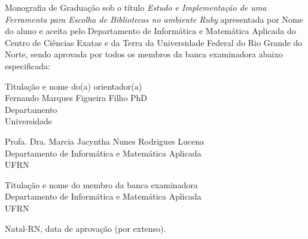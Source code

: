 \begin{folhadeaprovacao}
	\setlength{\ABNTsignthickness}{0.4pt}
	\setlength{\ABNTsignwidth}{10cm}
	
	\noindent 
	Monografia de Graduação sob o título \textit{Estudo e Implementação de uma Ferramenta para Escolha de Bibliotecas no ambiente Ruby} apresentada por 
	Nome do aluno e aceita pelo Departamento de Informática e Matemática Aplicada do
	Centro de Ciências Exatas e da Terra da Universidade Federal do Rio Grande do Norte,
	sendo aprovada por todos os membros da banca examinadora abaixo especificada:
		
	\assinatura
	{
		Titulação e nome do(a) orientador(a)\\
		{\small Fernando Marques Figueira Filho PhD} 															\\ 
		{\footnotesize
			Departamento 																	\\
		  	Universidade
		}
	}
		
	\assinatura
	{
		Profa. Dra. Marcia Jacyntha Nunes Rodrigues Lucena 						 \\ 
		{\footnotesize
			Departamento de Informática e Matemática Aplicada 																	 \\
		  	UFRN
		}
	}
		
	\assinatura
	{
		Titulação e nome do membro da banca examinadora 						 \\ 
		{\footnotesize
			Departamento de Informática e Matemática Aplicada 																	 \\
		  	UFRN
		}
	}
		
	\vfill
	
	\begin{center}
		Natal-RN, data de aprovação (por extenso).
	\end{center}
\end{folhadeaprovacao}